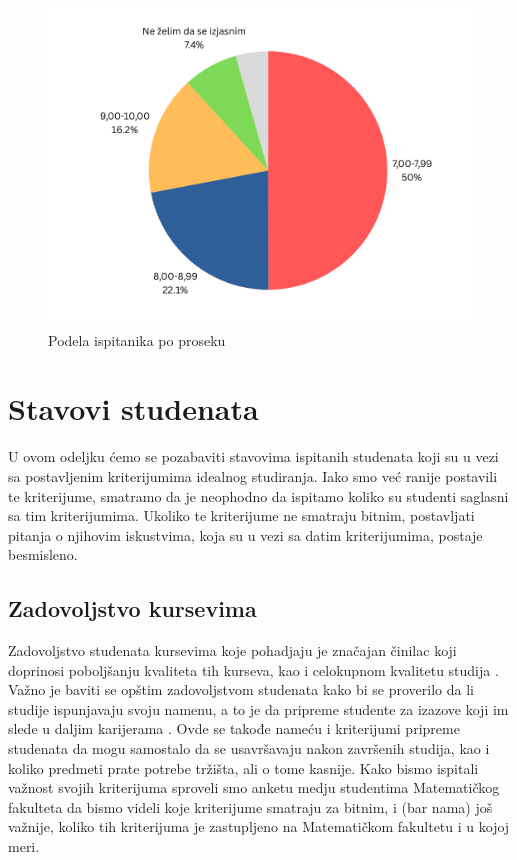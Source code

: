 \documentclass[a4paper]{article}
\begin{document}
{\begin{figure}[H]
    \centering
    \includegraphics[width=0.7\linewidth]{prosek.png}
    \caption{Podela ispitanika po proseku}
    \label{fig:raspodela_prosek}
\end{figure}





\section{Stavovi studenata}
\label{sec:stavovi}


U ovom odeljku ćemo se pozabaviti stavovima ispitanih studenata koji su u vezi sa postavljenim kriterijumima idealnog studiranja. Iako smo već ranije postavili te kriterijume, smatramo da je neophodno da ispitamo koliko su studenti saglasni sa tim kriterijumima. Ukoliko te kriterijume ne smatraju bitnim, postavljati pitanja o njihovim iskustvima, koja su u vezi sa datim kriterijumima, postaje besmisleno.


\subsection{Zadovoljstvo kursevima}
\label{subsec:zadovoljstvo_stavovi}

Zadovoljstvo studenata kursevima koje pohadjaju je značajan činilac koji doprinosi poboljšanju kvaliteta tih kurseva, kao i celokupnom kvalitetu studija \cite{satisfaction}. Važno je baviti se opštim zadovoljstvom studenata kako bi se proverilo da li studije ispunjavaju svoju namenu, a to je da pripreme studente za izazove koji im slede u daljim karijerama \cite{education}. Ovde se takođe nameću i kriterijumi pripreme studenata da mogu samostalo da se usavršavaju nakon završenih studija, kao i koliko predmeti prate potrebe tržišta, ali o tome kasnije.
Kako bismo ispitali važnost svojih kriterijuma sproveli smo anketu medju studentima Matematičkog fakulteta da bismo videli koje kriterijume smatraju za bitnim, i (bar nama) još važnije, koliko tih kriterijuma je zastupljeno na Matematičkom fakultetu i u kojoj meri.

}
\end{document}

